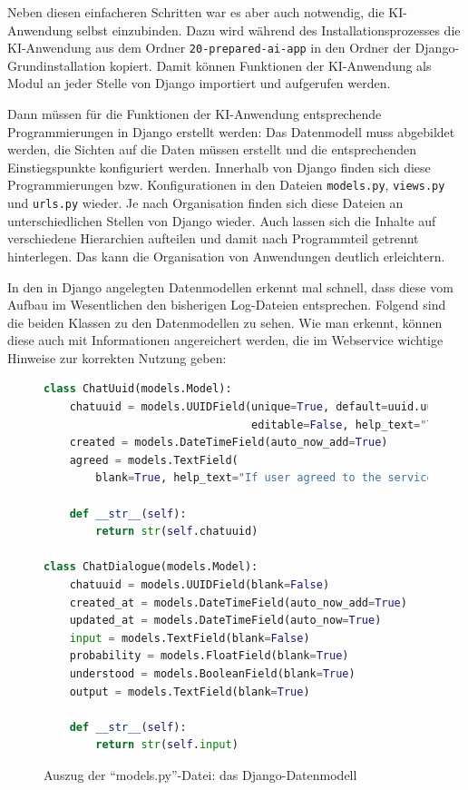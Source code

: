 \documentclass[12pt,oneside,titlepage,listof=totoc,bibliography=totoc]{scrartcl}
\newcommand{\code}[1]{\colorbox{code-gray}{\texttt{#1}}}
\begin{document}
Neben diesen einfacheren Schritten war es aber auch notwendig, die KI-Anwendung selbst einzubinden. Dazu wird während des Installationsprozesses die KI-Anwendung aus dem Ordner \code{20-prepared-ai-app} in den Ordner der Django-Grundinstallation kopiert. Damit können Funktionen der KI-Anwendung als Modul an jeder Stelle von Django importiert und aufgerufen werden. 

Dann müssen für die Funktionen der KI-Anwendung entsprechende Programmierungen in Django erstellt werden: Das Datenmodell muss abgebildet werden, die Sichten auf die Daten müssen erstellt und die entsprechenden Einstiegspunkte konfiguriert werden. Innerhalb von Django finden sich diese Programmierungen bzw. Konfigurationen in den Dateien \code{models.py}, \code{views.py} und \code{urls.py} wieder. Je nach Organisation finden sich diese Dateien an unterschiedlichen Stellen von Django wieder. Auch lassen sich die Inhalte auf verschiedene Hierarchien aufteilen und damit nach Programmteil getrennt hinterlegen. Das kann die Organisation von Anwendungen deutlich erleichtern.

In den in Django angelegten Datenmodellen erkennt mal \zb schnell, dass diese vom Aufbau im Wesentlichen den bisherigen Log-Dateien entsprechen. Folgend sind die beiden Klassen zu den Datenmodellen zu sehen. Wie man erkennt, können diese auch mit Informationen angereichert werden, die im Webservice wichtige Hinweise zur korrekten Nutzung geben:

\begin{figure}[H]
	\caption{Auszug der \enquote{models.py}-Datei: das Django-Datenmodell}
	\label{fig:code-django-data-modell}
\begin{lstlisting}[language=python]
class ChatUuid(models.Model):
    chatuuid = models.UUIDField(unique=True, default=uuid.uuid4,
                                editable=False, help_text="The UUID for a Chatbot conversation.")
    created = models.DateTimeField(auto_now_add=True)
    agreed = models.TextField(
        blank=True, help_text="If user agreed to the service terms (http://...), send 'Einverstanden'.")

    def __str__(self):
        return str(self.chatuuid)

class ChatDialogue(models.Model):
    chatuuid = models.UUIDField(blank=False)
    created_at = models.DateTimeField(auto_now_add=True)
    updated_at = models.DateTimeField(auto_now=True)
    input = models.TextField(blank=False)
    probability = models.FloatField(blank=True)
    understood = models.BooleanField(blank=True)
    output = models.TextField(blank=True)

    def __str__(self):
        return str(self.input)
\end{lstlisting}
\end{figure}
\end{document}
